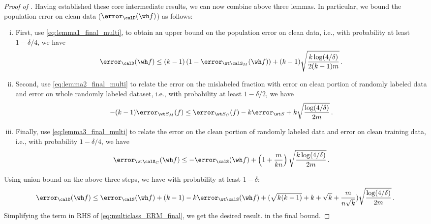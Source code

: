 \begin{proof}[Proof of ] 
    Having established these core intermediate results, 
    we can now combine above three lemmas. 
    In particular, we bound the population error 
    on clean data ($\error_\calD(\wh f)$) as follows:  
    \begin{enumerate}[(i)]
        \item First, use \eqref{eq:lemma1_final_multi}, 
        to obtain an upper bound on the population error on clean data, 
        i.e., with probability at least $1-\delta/4$, we have
        \begin{align}
            \error_{ \calD} (\wh f) \le (k-1)\left(1 - \error_{ \wt \calS_M}(\wh f) \right) + (k-1) \sqrt{\frac{k\log(4/\delta)}{2(k-1)m}} \,. 
        \end{align}
        \item  Second, use \eqref{eq:lemma2_final_multi}
        to relate the error on the mislabeled fraction 
        with error on clean portion of randomly labeled data 
        and error on whole randomly labeled dataset, 
        i.e., with probability at least $1-\delta/2$, we have 
        \begin{align}
            - (k-1)\error_{\wt S_M}(f) \le \error_{\wt S_C}(f) - k\error_{\wt S}  + k\sqrt{\frac{\log(4/\delta)}{2m}}  \,. 
        \end{align} 
        \item Finally, use \eqref{eq:lemma3_final_multi} 
        to relate the error on the clean portion of randomly labeled data 
        and error on clean training data, 
        i.e., with probability $1-\delta/4$, we have 
        \begin{align}
            \error_{\wt \calS_C} (\wh f)\le - \error_{\calS}( \wh f) + \left(1 + \frac{m}{kn} \right) \sqrt{\frac{k\log(4/\delta)}{2m}} \,. 
        \end{align} 
    \end{enumerate}

    Using union bound on the above three steps, 
    we have with probability at least $1-\delta$: 
    \begin{align}
        \error_\calD (\wh f) \le \error_{\calS}(\wh f) + (k-1) - k\error_{\wt \calS}(\wh f)   + (\sqrt{k(k-1)} + k + \sqrt{k} + \frac{m}{n\sqrt{k}})  \sqrt{\frac{\log(4/\delta)}{2m}} \,.\label{eq:multiclass_ERM_final}
    \end{align}
    Simplifying the term in RHS of \eqref{eq:multiclass_ERM_final}, 
    we get the desired result. 
    in the final bound. 
\end{proof}

